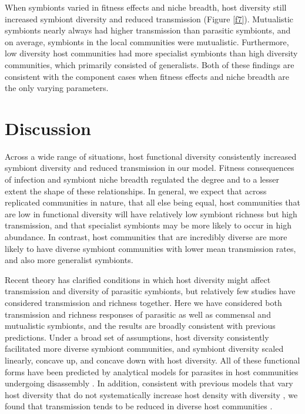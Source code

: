 \documentclass[12pt]{article}
\begin{document}
When symbionts varied in fitness effects and niche breadth, host diversity still increased symbiont diversity and reduced transmission (Figure \ref{f7}). %
Mutualistic symbionts nearly always had higher transmission than parasitic symbionts, and on average, symbionts in the local communities were mutualistic. 
Furthermore, low diversity host communities had more specialist symbionts than high diversity communities, which primarily consisted of generalists. 
Both of these findings are consistent with the component cases when fitness effects and niche breadth are the only varying parameters.

\section*{Discussion}

Across a wide range of situations, host functional diversity consistently increased symbiont diversity and reduced transmission in our model. 
Fitness consequences of infection and symbiont niche breadth regulated the degree and to a lesser extent the shape of these relationships.
In general, we expect that across replicated communities in nature, that all else being equal, host communities that are low in functional diversity will have relatively low symbiont richness but high transmission, and that specialist symbionts may be more likely to occur in high abundance. 
In contrast, host communities that are incredibly diverse are more likely to have diverse symbiont communities with lower mean transmission rates, and also more generalist symbionts. 

Recent theory has clarified conditions in which host diversity might affect transmission and diversity of parasitic symbionts, but relatively few studies have considered transmission and richness together. 
Here we have considered both transmission and richness responses of parasitic as well as commensal and mutualistic symbionts, and the results are broadly consistent with previous predictions. 
Under a broad set of assumptions, host diversity consistently facilitated more diverse symbiont communities, and symbiont diversity scaled linearly, concave up, and concave down with host diversity. 
All of these functional forms have been predicted by analytical models for parasites in host communities undergoing disassembly \cite{Lafferty2012}. 
In addition, consistent with previous models that vary host diversity that do not systematically increase host density with diversity \citep{Mihaljevic2014}, we found that transmission tends to be reduced in diverse host communities \citep{Dobson2004a, Rudolf2005, Roche2012, Joseph2013a, Mihaljevic2014}.
\end{document}
